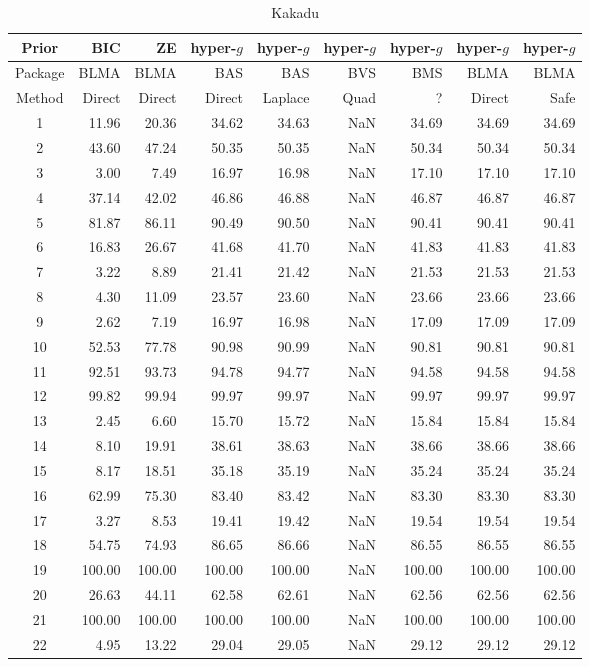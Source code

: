 \documentclass{article}[12pt]
\begin{document}
\begin{table}[ht]
	\centering
	{\small 	
	\begin{tabular}{c|r|r|rrrrrr}
		Prior   & BIC    & ZE     & hyper-$g$ & hyper-$g$ & hyper-$g$  & hyper-$g$ & hyper-$g$ & hyper-$g$ \\
		\hline 
		Package & BLMA   & BLMA   & BAS       & BAS       & BVS        & BMS       & BLMA      & BLMA       \\
		\hline 
		Method  & Direct & Direct & Direct    & Laplace   & Quad & ?         & Direct    & Safe      \\ 
		\hline
		1 & 11.96 & 20.36 & 34.62 & 34.63 & NaN & 34.69 & 34.69 & 34.69 \\ 
		2 & 43.60 & 47.24 & 50.35 & 50.35 & NaN & 50.34 & 50.34 & 50.34 \\ 
		3 & 3.00 & 7.49 & 16.97 & 16.98 & NaN & 17.10 & 17.10 & 17.10 \\ 
		4 & 37.14 & 42.02 & 46.86 & 46.88 & NaN & 46.87 & 46.87 & 46.87 \\ 
		5 & 81.87 & 86.11 & 90.49 & 90.50 & NaN & 90.41 & 90.41 & 90.41 \\ 
		6 & 16.83 & 26.67 & 41.68 & 41.70 & NaN & 41.83 & 41.83 & 41.83 \\ 
		7 & 3.22 & 8.89 & 21.41 & 21.42 & NaN & 21.53 & 21.53 & 21.53 \\ 
		8 & 4.30 & 11.09 & 23.57 & 23.60 & NaN & 23.66 & 23.66 & 23.66 \\ 
		9 & 2.62 & 7.19 & 16.97 & 16.98 & NaN & 17.09 & 17.09 & 17.09 \\ 
		10 & 52.53 & 77.78 & 90.98 & 90.99 & NaN & 90.81 & 90.81 & 90.81 \\ 
		11 & 92.51 & 93.73 & 94.78 & 94.77 & NaN & 94.58 & 94.58 & 94.58 \\ 
		12 & 99.82 & 99.94 & 99.97 & 99.97 & NaN & 99.97 & 99.97 & 99.97 \\ 
		13 & 2.45 & 6.60 & 15.70 & 15.72 & NaN & 15.84 & 15.84 & 15.84 \\ 
		14 & 8.10 & 19.91 & 38.61 & 38.63 & NaN & 38.66 & 38.66 & 38.66 \\ 
		15 & 8.17 & 18.51 & 35.18 & 35.19 & NaN & 35.24 & 35.24 & 35.24 \\ 
		16 & 62.99 & 75.30 & 83.40 & 83.42 & NaN & 83.30 & 83.30 & 83.30 \\ 
		17 & 3.27 & 8.53 & 19.41 & 19.42 & NaN & 19.54 & 19.54 & 19.54 \\ 
		18 & 54.75 & 74.93 & 86.65 & 86.66 & NaN & 86.55 & 86.55 & 86.55 \\ 
		19 & 100.00 & 100.00 & 100.00 & 100.00 & NaN & 100.00 & 100.00 & 100.00 \\ 
		20 & 26.63 & 44.11 & 62.58 & 62.61 & NaN & 62.56 & 62.56 & 62.56 \\ 
		21 & 100.00 & 100.00 & 100.00 & 100.00 & NaN & 100.00 & 100.00 & 100.00 \\ 
		22 & 4.95 & 13.22 & 29.04 & 29.05 & NaN & 29.12 & 29.12 & 29.12 \\ 
		\hline
	\end{tabular}
}
	\caption{Kakadu}
	\label{tab:KakaduResults1}
\end{table}
\end{document}
